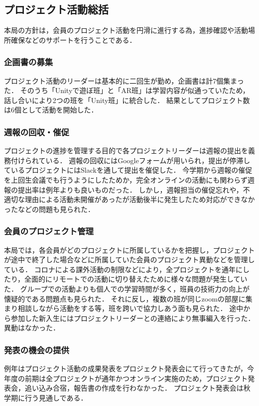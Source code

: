 \subsection*{プロジェクト活動総括}


本局の方針は，会員のプロジェクト活動を円滑に進行する為，進捗確認や活動場所確保などのサポートを行うことである．

\subsubsection*{企画書の募集}

プロジェクト活動のリーダーは基本的に二回生が勤め，企画書は計7個集まった．
そのうち「Unityで遊ぼ班」と「AR班」は学習内容が似通っていたため，話し合いにより2つの班を「Unity班」に統合した．
結果としてプロジェクト数は6個として活動を開始した．

\subsubsection*{週報の回収・催促}

プロジェクトの進捗を管理する目的で各プロジェクトリーダーは週報の提出を義務付けられている．
週報の回収にはGoogleフォームが用いられ，提出が停滞しているプロジェクトにはSlackを通して提出を催促した．
今学期から週報の催促を上回生会議でも行うようにしたためか，完全オンラインの活動にも関わらず週報の提出率は例年よりも良いものだった．
しかし，週報担当の催促忘れや，不適切な理由による活動未開催があったが活動後半に発生したため対応ができなかったなどの問題も見られた．

\subsubsection*{会員のプロジェクト管理}

本局では，各会員がどのプロジェクトに所属しているかを把握し，プロジェクトが途中で終了した場合などに所属していた会員のプロジェクト異動などを管理している．
コロナによる課外活動の制限などにより，全プロジェクトを通年にしたり，全面的にリモートでの活動に切り替えたために様々な問題が発生していた．
グループでの活動よりも個人での学習時間が多く，班員の技術力の向上が懐疑的である問題点も見られた．
それに反し，複数の班が同じzoomの部屋に集まり相談しながら活動をする等，班を跨いで協力しあう面も見られた．
途中から参加した新入生にはプロジェクトリーダーとの連絡により無事編入を行った．
異動はなかった．

\subsubsection*{発表の機会の提供}

例年はプロジェクト活動の成果発表をプロジェクト発表会にて行ってきたが，今年度の前期は全プロジェクトが通年かつオンライン実施のため，プロジェクト発表会，追い込み合宿，報告書の作成を行わなかった．
プロジェクト発表会は秋学期に行う見通しである．